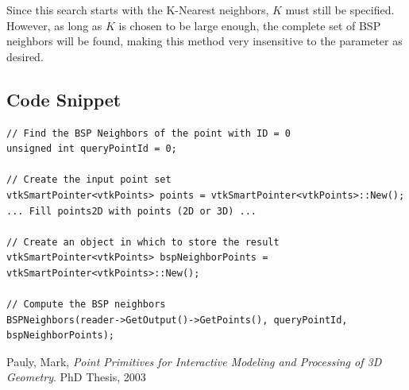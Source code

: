 \documentclass{InsightArticle}
\begin{document}
Since this search starts with the K-Nearest neighbors, $K$ must still be specified. However, as long as $K$ is chosen to be large enough, the complete set of BSP neighbors will be found, making this method very insensitive to the parameter as desired.

\subsection{Code Snippet}

\begin{verbatim}
// Find the BSP Neighbors of the point with ID = 0
unsigned int queryPointId = 0;
  
// Create the input point set
vtkSmartPointer<vtkPoints> points = vtkSmartPointer<vtkPoints>::New();
... Fill points2D with points (2D or 3D) ...

// Create an object in which to store the result
vtkSmartPointer<vtkPoints> bspNeighborPoints = vtkSmartPointer<vtkPoints>::New();
    
// Compute the BSP neighbors
BSPNeighbors(reader->GetOutput()->GetPoints(), queryPointId, bspNeighborPoints);
\end{verbatim}


\begin{thebibliography}{9}

	  Pauly, Mark,
	  \emph{Point Primitives for Interactive Modeling and Processing of 3D Geometry}.
	  PhD Thesis, 2003

\end{thebibliography}
\end{document}
